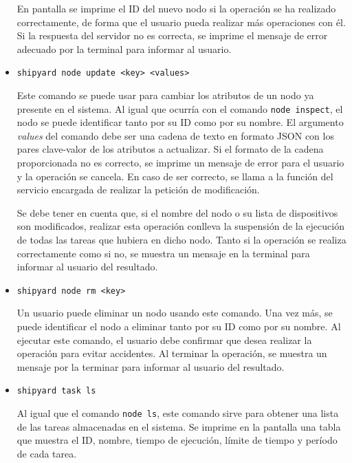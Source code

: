 \begin{itemize}
          En pantalla se imprime el ID del nuevo nodo si la operación se ha
          realizado correctamente, de forma que el usuario pueda realizar más
          operaciones con él. Si la respuesta del servidor no es correcta, se
          imprime el mensaje de error adecuado por la terminal para informar al
          usuario.

    \item \lstinline{shipyard node update <key> <values>}

          Este comando se puede usar para cambiar los atributos de un nodo ya
          presente en el sistema. Al igual que ocurría con el comando
          \lstinline{node inspect}, el nodo se puede identificar tanto por su ID
          como por su nombre. El argumento \textit{values} del comando debe ser
          una cadena de texto en formato JSON con los pares clave-valor de los
          atributos a actualizar. Si el formato de la cadena proporcionada no es
          correcto, se imprime un mensaje de error para el usuario y la operación
          se cancela. En caso de ser correcto, se llama a la función del servicio
          encargada de realizar la petición de modificación.

          Se debe tener en cuenta que, si el nombre del nodo o su lista de
          dispositivos son modificados, realizar esta operación conlleva la
          suspensión de la ejecución de todas las tareas que hubiera en dicho
          nodo. Tanto si la operación se realiza correctamente como si no, se
          muestra un mensaje en la terminal para informar al usuario del
          resultado.

    \item \lstinline{shipyard node rm <key>}

          Un usuario puede eliminar un nodo usando este comando. Una vez más, se
          puede identificar el nodo a eliminar tanto por su ID como por su nombre.
          Al ejecutar este comando, el usuario debe confirmar que desea realizar
          la operación para evitar accidentes. Al terminar la operación, se
          muestra un mensaje por la terminar para informar al usuario del
          resultado.

    \item \lstinline{shipyard task ls}

          Al igual que el comando \lstinline{node ls}, este comando sirve para
          obtener una lista de las tareas almacenadas en el sistema. Se imprime en
          la pantalla una tabla que muestra el ID, nombre, tiempo de ejecución,
          límite de tiempo y período de cada tarea.


\end{itemize}
